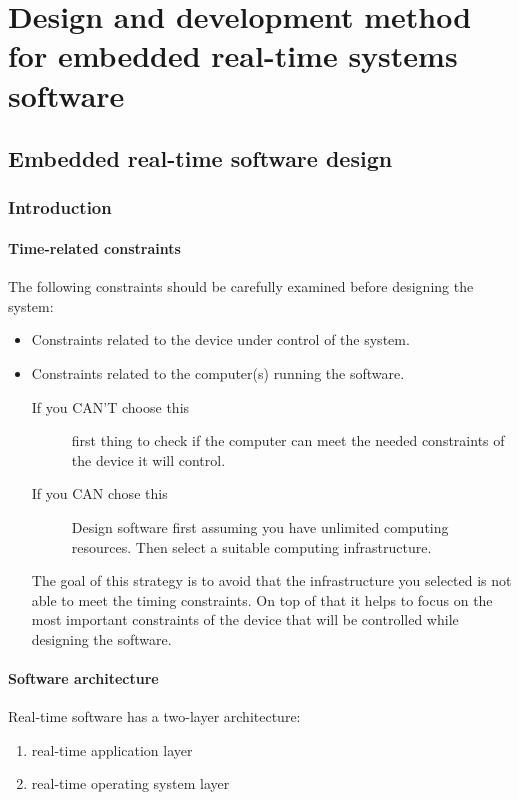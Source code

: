 \documentclass[../main.tex]{subfiles}
\begin{document}
\chapter{Design and development method for embedded real-time systems software}

\section{Embedded real-time software design}
\subsection{Introduction}
\subsubsection{Time-related constraints}
The following constraints should be carefully examined before designing the system: 
\begin{itemize}
	\item Constraints related to the device under control of the system. 
	\item Constraints related to the computer(s) running the software. 
		\begin{description}
			\item[If you CAN'T choose this] first thing to check if the computer can meet the needed constraints of the device it will control.
				\item[If you CAN  chose this] Design software first assuming you have unlimited computing resources. Then select a suitable computing infrastructure.
		\end{description} 
	The goal of this strategy is to avoid that the infrastructure you selected is not able to meet the timing constraints. On top of that it helps to focus on the most important constraints of the device that will be controlled while designing the software.
\end{itemize}

\subsubsection{Software architecture}
Real-time software has a two-layer architecture: 
\begin{enumerate}
	\item real-time application layer
	\item real-time operating system layer
\end{enumerate}
\end{document}
